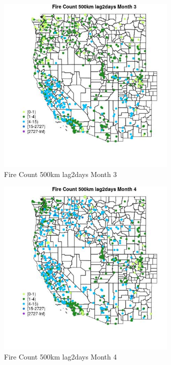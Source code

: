 \begin{figure} 
\centering  
\includegraphics[width=0.77\textwidth]{Code_Outputs/Report_ML_input_PM25_Step4_part_f_de_duplicated_aveswNAs_MapObsMo3Fire_Count_500km_lag2days.jpg} 
\caption{\label{fig:Report_ML_input_PM25_Step4_part_f_de_duplicated_aveswNAsMapObsMo3Fire_Count_500km_lag2days}Fire Count 500km lag2days Month 3} 
\end{figure} 
 

\begin{figure} 
\centering  
\includegraphics[width=0.77\textwidth]{Code_Outputs/Report_ML_input_PM25_Step4_part_f_de_duplicated_aveswNAs_MapObsMo4Fire_Count_500km_lag2days.jpg} 
\caption{\label{fig:Report_ML_input_PM25_Step4_part_f_de_duplicated_aveswNAsMapObsMo4Fire_Count_500km_lag2days}Fire Count 500km lag2days Month 4} 
\end{figure} 
 

